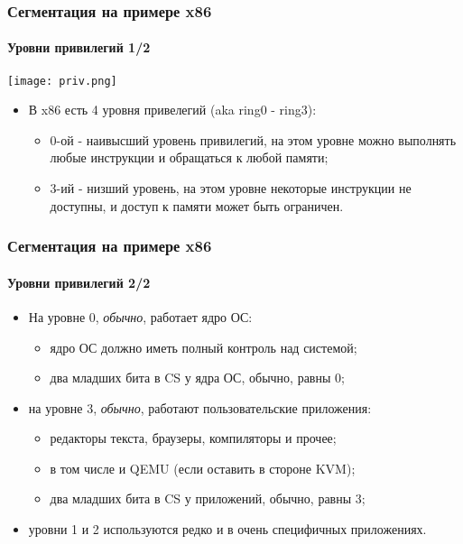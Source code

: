 \begin{frame}
\frametitle{Сегментация на примере x86}
\framesubtitle{Уровни привилегий 1/2}
\begin{center}
  \texttt{[image: priv.png]}
\end{center}
\begin{itemize}
  \item В x86 есть 4 уровня привелегий (aka ring0 - ring3):
  \begin{itemize}
    \item 0-ой - наивысший уровень привилегий, на этом уровне можно выполнять
    любые инструкции и обращаться к любой памяти;
    \item 3-ий - низший уровень, на этом уровне некоторые инструкции не
    доступны, и доступ к памяти может быть ограничен.
  \end{itemize}
\end{itemize}
\end{frame}

\begin{frame}
\frametitle{Сегментация на примере x86}
\framesubtitle{Уровни привилегий 2/2}
\begin{itemize}
  \item На уровне 0, \emph{обычно}, работает ядро ОС:
  \begin{itemize}
    \item ядро ОС должно иметь полный контроль над системой;
    \item два младших бита в CS у ядра ОС, обычно, равны 0;
  \end{itemize}
  \item на уровне 3, \emph{обычно}, работают пользовательские приложения:
  \begin{itemize}
    \item редакторы текста, браузеры, компиляторы и прочее;
    \item в том числе и QEMU (если оставить в стороне KVM);
    \item два младших бита в CS у приложений, обычно, равны 3;
  \end{itemize}
  \item уровни 1 и 2 используются редко и в очень специфичных приложениях.
\end{itemize}
\end{frame}

